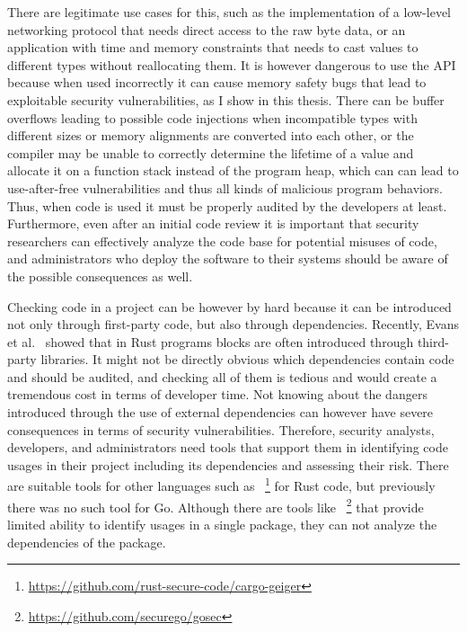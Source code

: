 There are legitimate use cases for this, such as the implementation of a low-level networking protocol that needs
direct access to the raw byte data, or an application with time and memory constraints that needs to cast values to
different types without reallocating them.
It is however dangerous to use the \unsafe{} \acrshort{API} because when used incorrectly it can cause memory safety
bugs that lead to exploitable security vulnerabilities, as I show in this thesis.
There can be buffer overflows leading to possible code injections when incompatible types with different sizes or
memory alignments are converted into each other, or the compiler may be unable to correctly determine the lifetime of
a value and allocate it on a function stack instead of the program heap, which can can lead to use-after-free
vulnerabilities and thus all kinds of malicious program behaviors.
Thus, when \unsafe{} code is used it must be properly audited by the developers at least.
Furthermore, even after an initial code review it is important that security researchers can effectively analyze the
code base for potential misuses of \unsafe{} code, and administrators who deploy the software to their systems should
be aware of the possible consequences as well.

Checking \unsafe{} code in a project can be however by hard because it can be introduced not only through first-party
code, but also through dependencies.
Recently, Evans et al.~\cite{evans2020} showed that in Rust programs \unsafe{} blocks are often introduced through
third-party libraries.
It might not be directly obvious which dependencies contain \unsafe{} code and should be audited, and checking all of
them is tedious and would create a tremendous cost in terms of developer time.
Not knowing about the dangers introduced through the use of external dependencies can however have severe consequences
in terms of security vulnerabilities.
Therefore, security analysts, developers, and administrators need tools that support them in identifying \unsafe{}
code usages in their project including its dependencies and assessing their risk.
There are suitable tools for other languages such as \toolCargoGeiger{}~\footnote{\url{https://github.com/rust-secure-code/cargo-geiger}}
for Rust code, but previously there was no such tool for Go.
Although there are tools like \toolGosec{}~\footnote{\url{https://github.com/securego/gosec}} that provide limited
ability to identify \unsafe{} usages in a single package, they can not analyze the dependencies of the package.

